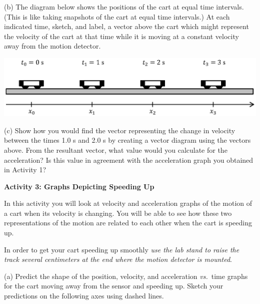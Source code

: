 (b) The diagram below shows the positions of the cart at equal time intervals.
(This is like taking snapshots of the cart at equal time intervals.) At each
indicated time, sketch, and label, a vector above the cart which might represent the velocity
of the cart at that time while it is moving at a constant velocity away from
the motion detector.

{\par\centering \includegraphics{changing/carts_const_v.eps} \par}

(c) Show how you would find the vector representing the change in velocity
between the times 1.0 s and 2.0 s by creating a vector diagram using the 
vectors above. From the resultant vector, what value would you calculate for 
the acceleration? Is this value in agreement
with the acceleration graph you obtained in Activity 1?
\answerspace{20mm}

\pagebreak[2]
\textbf{Activity 3: Graphs Depicting Speeding Up} 

In this activity you will look at velocity and acceleration graphs of the
motion of a cart when its velocity is changing. You will be able to see how
these two representations of the motion are related to each other when the cart
is speeding up.

In order to get your cart speeding up smoothly \textit{use the lab stand to raise the
track several centimeters at the end where the motion detector is mounted}.

(a) Predict the shape of the position, velocity, and acceleration \textit{vs.}~time graphs
for the cart moving away from the sensor and speeding up. Sketch your predictions
on the following axes using dashed lines.


